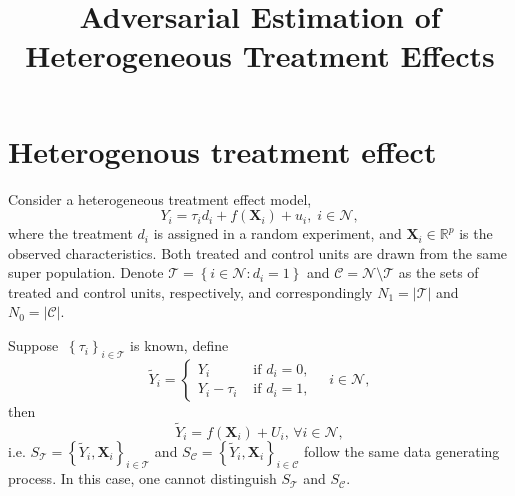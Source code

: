 



\title{Adversarial Estimation of Heterogeneous Treatment Effects}
\date{}


\maketitle


\section{Heterogenous treatment effect}

Consider a heterogeneous treatment effect model,
\begin{equation}
    Y_{i}  = \tau _{i}  d_{i} + f\left( \bm{X} _i \right) + u_i,\;  i \in \mathcal{N},
\end{equation}
where the treatment \(d_i\) is assigned in a random experiment, and \(\bm{X} _{i} \in \mathbb{R}^{p} \) is the observed characteristics. Both treated and control units are drawn from the same super population.
Denote 
\(\mathcal{T} =\left\{ i \in \mathcal{N} : d _{i} = 1 \right\} \) and
\(\mathcal{C} = \mathcal{N} \setminus \mathcal{T} \) 
as the sets of treated and control units, respectively, and correspondingly \(N_{1} = \vert \mathcal{T}  \vert \) and \(N_{0} = \vert \mathcal{C}  \vert \).

Suppose \(\ \left\{ \tau _{i}  \right\} _{i \in \mathcal{T} }\)  is known, define
\begin{equation}
    \tilde{Y}_{i}  = \begin{cases}
        Y_{i}  & \text{ if }  d_{i} = 0, \\
        Y_i -\tau _{i} & \text{ if }  d _{i} = 1,
    \end{cases} \quad i \in \mathcal{N},
\end{equation}
then
\[
    \tilde{Y}_{i} = f\left( \bm{X} _{i}  \right) + U_i,\, \forall i\in \mathcal{N}, 
\]
i.e. \(S_{\mathcal{T} } = \left\{ \tilde{Y} _{i} , \bm{X} _{i}  \right\}_{i\in \mathcal{T} } \) and \(S_{\mathcal{\mathcal{C} } } = \left\{ \tilde{Y} _{i} , \bm{X} _{i}  \right\}_{i\in \mathcal{\mathcal{C} } } \) follow the same data generating process. In this case, one cannot distinguish \(S_{\mathcal{T} }\) and \(S_{\mathcal{C} }\). 

